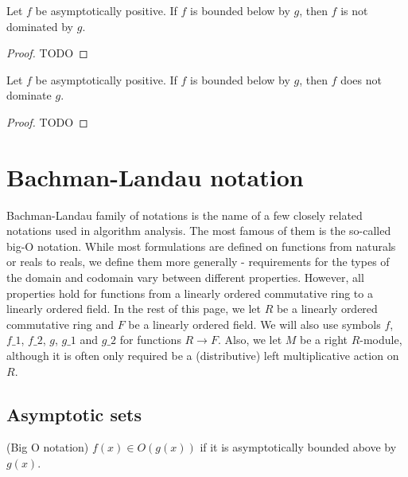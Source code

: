 \begin{lemma}
    \label{thm:asymp_bounded_below_imp_not_right_dom}
    \leanok
    Let $f$ be asymptotically positive. If $f$ is bounded below by $g$, then $f$ 
    is not dominated by $g$.
\end{lemma}

\begin{proof}
    TODO 
\end{proof}

\begin{lemma}
    \label{thm:asymp_bounded_above_imp_not_left_dom}
    \leanok
    Let $f$ be asymptotically positive. If $f$ is bounded below by $g$, then $f$ 
    does not dominate $g$.
\end{lemma}

\begin{proof}
    TODO 
\end{proof}


\section{Bachman-Landau notation}

Bachman-Landau family of notations is the name of a few closely related notations used in 
algorithm analysis. The most famous of them is the so-called big-O notation. While
most formulations are defined on functions from naturals or reals to reals, we define 
them more generally - requirements for the types of the domain and codomain vary between 
different properties. However, all properties hold for functions from a linearly ordered 
commutative ring to a linearly ordered field. In the rest of this page, we let $R$ be a linearly 
ordered commutative ring and $F$ be a linearly ordered field. We will also use symbols $f$, 
$f\_1$, $f\_2$, $g$, $g\_1$ and $g\_2$ for functions $R \to F$. Also, we let $M$ be 
a right $R$-module, although it is often only required be a (distributive) left multiplicative 
action on $R$.


\subsection{Asymptotic sets}

\begin{definition}(Big O notation)
    \label{def:big_o}
    \leanok
    $f(x) \in O(g(x))$ if it is asymptotically bounded above by $g(x)$.
\end{definition}


